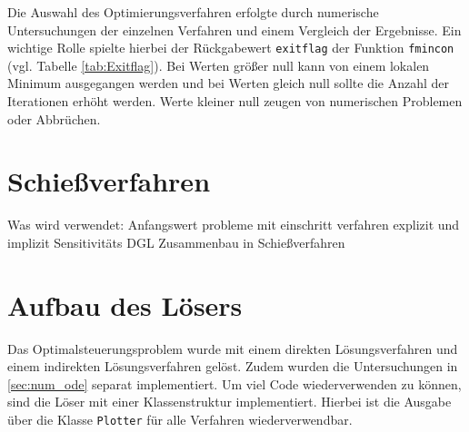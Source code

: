 Die Auswahl des Optimierungsverfahren erfolgte durch numerische Untersuchungen der einzelnen Verfahren und einem Vergleich der Ergebnisse. Ein wichtige Rolle spielte hierbei der Rückgabewert \texttt{exitflag} der Funktion \texttt{fmincon} (vgl. Tabelle \ref{tab:Exitflag}). Bei Werten größer null kann von einem lokalen Minimum ausgegangen werden und bei Werten gleich null sollte die Anzahl der Iterationen erhöht werden. Werte kleiner null zeugen von numerischen Problemen oder Abbrüchen.

%
%

\section{Schießverfahren}

Was wird verwendet:
Anfangswert probleme mit einschritt verfahren explizit und implizit
Sensitivitäts DGL
Zusammenbau in Schießverfahren


\section{Aufbau des Lösers}
Das Optimalsteuerungsproblem wurde mit einem direkten Lösungsverfahren und einem indirekten Lösungsverfahren gelöst. Zudem wurden die Untersuchungen in \autoref{sec:num_ode} separat implementiert. Um viel Code wiederverwenden zu können, sind die Löser mit einer Klassenstruktur implementiert. Hierbei ist die Ausgabe über die Klasse \verb+Plotter+ für alle Verfahren wiederverwendbar.

